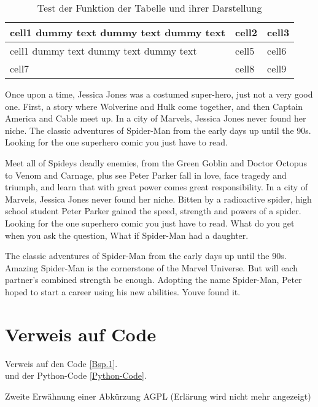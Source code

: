 \begin{table}[h!]
	\begin{center}
		\begin{tabular}{ | m{5cm} | m{1cm}| m{1cm} | } 
			\hline
			cell1 dummy text dummy text dummy text& cell2 & cell3 \\ 
			\hline
			cell1 dummy text dummy text dummy text & cell5 & cell6 \\ 
			\hline
			cell7 & cell8 & cell9 \\ 
			\hline
		\end{tabular}
	\end{center}
	\caption{Test der Funktion der Tabelle und ihrer Darstellung}
	\label{tabelle1}
\end{table}


Once upon a time, Jessica Jones was a costumed super-hero, just not a very good one. First, a story where Wolverine and Hulk come together, and then Captain America and Cable meet up. In a city of Marvels, Jessica Jones never found her niche. The classic adventures of Spider-Man from the early days up until the 90s. Looking for the one superhero comic you just have to read.

Meet all of Spideys deadly enemies, from the Green Goblin and Doctor Octopus to Venom and Carnage, plus see Peter Parker fall in love, face tragedy and triumph, and learn that with great power comes great responsibility. In a city of Marvels, Jessica Jones never found her niche. Bitten by a radioactive spider, high school student Peter Parker gained the speed, strength and powers of a spider. Looking for the one superhero comic you just have to read. What do you get when you ask the question, What if Spider-Man had a daughter.

The classic adventures of Spider-Man from the early days up until the 90s. Amazing Spider-Man is the cornerstone of the Marvel Universe. But will each partner’s combined strength be enough. Adopting the name Spider-Man, Peter hoped to start a career using his new abilities. Youve found it.

\section{Verweis auf Code}
Verweis auf den Code \autoref{Bsp.1}.\\
und der Python-Code \autoref{Python-Code}.

Zweite Erwähnung einer Abkürzung \ac{AGPL} (Erlärung wird nicht mehr angezeigt)


